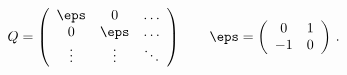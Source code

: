\begin{equation}
Q = \left( \begin{array}{ccc} \eps & 0&\ldots \\
0& \eps&\ldots\\
\vdots & \vdots & \ddots
\end{array}\right)\qquad \eps = \left(\begin{array}{cc} 0&1\\-1&0
\end{array}\right)\,.
\end{equation}

